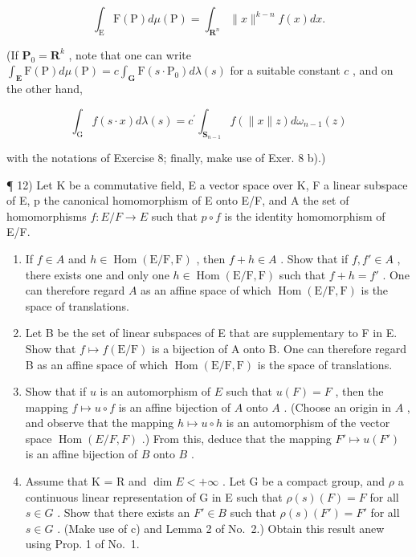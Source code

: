 \[
\int_ {\mathrm{E}} \mathrm{F} (\mathrm{P}) d \mu (\mathrm{P}) = \int_ {\mathbf {R} ^ {n}} \| x \| ^ {k - n} f (x) d x.
\]

(If \(\mathbf{P}_0 = \mathbf{R}^k\) , note that one can write \(\int_{\mathbf{E}} \mathrm{F}(\mathrm{P}) d\mu(\mathrm{P}) = c \int_{\mathbf{G}} \mathrm{F}(s \cdot \mathrm{P}_0) d\lambda(s)\) for a suitable constant \(c\) , and on the other hand,

\[
\int_ {\mathrm{G}} f (s \cdot x) d \lambda (s) = c ^ {\prime} \int_ {\mathbf {S} _ {n - 1}} f (\| x \| z) d \omega_ {n - 1} (z)
\]

with the notations of Exercise 8; finally, make use of Exer. 8 b).)

¶ 12) Let K be a commutative field, E a vector space over K, F a linear subspace of E, p the canonical homomorphism of E onto E/F, and A the set of homomorphisms \(f: E/F \to E\) such that \(p \circ f\) is the identity homomorphism of E/F.

\begin{enumerate}
\def\labelenumi{\alph{enumi})}
\item
  If \(f \in A\) and \(h \in \operatorname{Hom}(\mathrm{E} / \mathrm{F}, \mathrm{F})\) , then \(f + h \in A\) . Show that if \(f, f' \in A\) , there exists one and only one \(h \in \operatorname{Hom}(\mathrm{E} / \mathrm{F}, \mathrm{F})\) such that \(f + h = f'\) . One can therefore regard \(A\) as an affine space of which \(\operatorname{Hom}(\mathrm{E} / \mathrm{F}, \mathrm{F})\) is the space of translations.
\item
  Let B be the set of linear subspaces of E that are supplementary to F in E. Show that \(f \mapsto f(\mathrm{E}/\mathrm{F})\) is a bijection of A onto B. One can therefore regard B as an affine space of which \(\operatorname{Hom}(\mathrm{E}/\mathrm{F}, \mathrm{F})\) is the space of translations.
\item
  Show that if \(u\) is an automorphism of \(E\) such that \(u(F) = F\) , then the mapping \(f \mapsto u \circ f\) is an affine bijection of \(A\) onto \(A\) . (Choose an origin in \(A\) , and observe that the mapping \(h \mapsto u \circ h\) is an automorphism of the vector space \(\operatorname{Hom}(E/F, F)\) .) From this, deduce that the mapping \(F' \mapsto u(F')\) is an affine bijection of \(B\) onto \(B\) .
\item
  Assume that K = R and \(\dim E < +\infty\) . Let G be a compact group, and \(\rho\) a continuous linear representation of G in E such that \(\rho(s)(F) = F\) for all \(s \in G\) . Show that there exists an \(F' \in B\) such that \(\rho(s)(F') = F'\) for all \(s \in G\) . (Make use of c) and Lemma 2 of No.~2.) Obtain this result anew using Prop. 1 of No.~1.
\end{enumerate}

